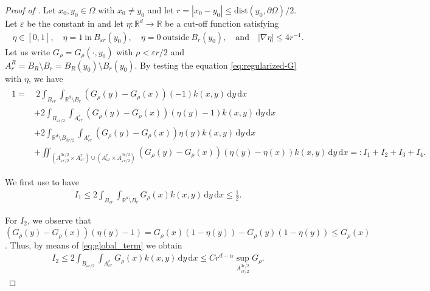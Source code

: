 \documentclass[reqno]{amsart}
\theoremstyle{plain}
\theoremstyle{definition}
\numberwithin{equation}{section}
\newcommand{\R}{\mathbb{R}}
\newcommand{\Rd}{\mathbb{R}^d}
\newcommand{\dx} {\, \mathrm{d}x}
\newcommand{\dy} {\, \mathrm{d}y}
\begin{document}
\begin{proof} [Proof of ]
Let $x_0, y_0 \in \Omega$ with $x_0 \neq y_0$ and let $r = |x_0 - y_0| \leq \mathrm{dist}(y_0, \partial \Omega)/2$. Let $\varepsilon$ be the constant in  and let $\eta : \Rd \rightarrow \R$ be a cut-off function satisfying
\begin{align*}
\eta \in [0,1], \quad 
\eta = 1~\text{in}~ B_{\varepsilon r}(y_0), \quad 
\eta = 0 ~\text{outside}~ B_r(y_0), \quad\text{and}\quad
|\nabla \eta| \leq 4r^{-1}.
\end{align*}
Let us write $G_{\rho} = G_{\rho}(\cdot, y_0)$ with $\rho < \varepsilon r/2$ and $A^R_r = B_R \setminus B_r = B_R(y_0) \setminus B_r(y_0)$. By testing the equation \eqref{eq:regularized-G} with $\eta$, we have
\begin{align} \label{eq:I_1,I_2,I_3,I_4_lower}
\begin{split}
1
=&~ 2\int_{B_{\varepsilon r}} \int_{\Rd \setminus B_r} 
(G_{\rho}(y) - G_{\rho}(x)) (-1) k(x,y) \dy \dx \\
&+ 2\int_{B_{\varepsilon r/2}} \int_{A^r_{\varepsilon r}} 
(G_{\rho}(y) - G_{\rho}(x)) (\eta(y) - 1) k(x,y) \dy \dx \\
&+ 2\int_{\Rd \setminus B_{3r/2}} \int_{A^r_{\varepsilon r}} 
(G_{\rho}(y) - G_{\rho}(x)) \eta(y) k(x,y) \dy \dx \\
&+ \iint_{\left( A^{3r/2}_{\varepsilon r/2} \times A^r_{\varepsilon r} \right) 
\cup \left( A^r_{\varepsilon r} \times A^{3r/2}_{\varepsilon r/2} \right)} 
(G_{\rho}(y) - G_{\rho}(x)) (\eta(y) - \eta(x)) k(x,y) \dy \dx 
=: I_1 + I_2 + I_3 + I_4.
\end{split}
\end{align}


We first use  to have
\begin{align} \label{eq:I_1_lower}
I_1 
\leq 2\int_{B_{\varepsilon r}} \int_{\Rd \setminus B_r} G_{\rho}(x) k(x,y) \dy \dx 
\leq \frac{1}{2}.
\end{align}


For $I_2$, we observe that 
$(G_{\rho}(y) - G_{\rho}(x))(\eta(y) - 1) = G_{\rho}(x)(1-\eta(y)) - G_{\rho}(y)(1-\eta(y)) \leq G_{\rho}(x)$. 
Thus, by means of \eqref{eq:global_term} we obtain
\begin{align} \label{eq:I_2_lower}
I_2 
\leq 2 \int_{B_{\varepsilon r/2}} \int_{A^r_{\varepsilon r}} G_{\rho}(x) k(x,y) \dy \dx
\leq Cr^{d-\alpha} \sup_{A^{3r/2}_{\varepsilon r/2}} G_{\rho}.
\end{align}


\end{proof}
\end{document}
